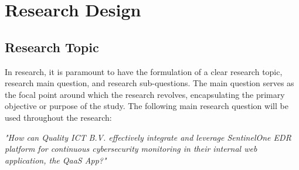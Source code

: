 \chapter{Research Design}

\section{Research Topic}
In research, it is paramount to have the formulation of a clear research topic, research main question,
and research sub-questions. The main question serves as the focal point around which the research revolves,
encapsulating the primary objective or purpose of the study.
The following main research question will be used throughout the research:
\begin{center}
      \textit{"How can Quality ICT B.V. effectively integrate and leverage SentinelOne EDR platform
            for continuous cybersecurity monitoring in their internal web application, the QaaS App?"}
\end{center}
